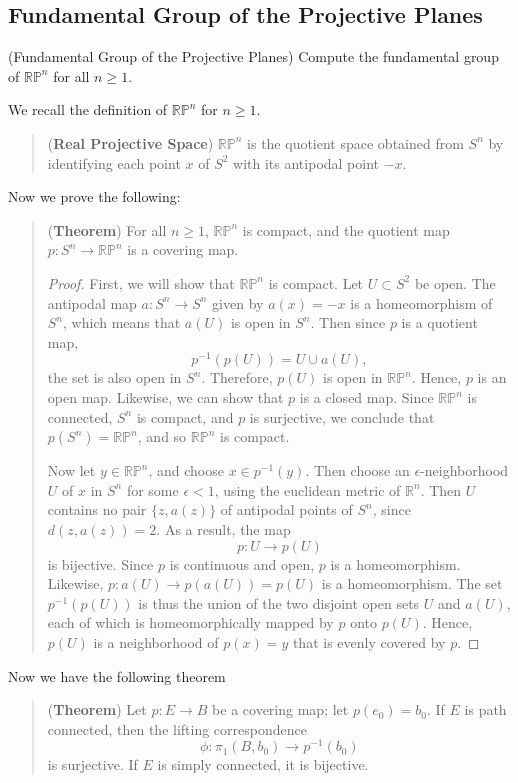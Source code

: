 \documentclass{article}
\begin{document}
\subsection{Fundamental Group of the Projective Planes}
\begin{prb}{(Fundamental Group of the Projective Planes)}
	Compute the fundamental group of $\mathbb{RP}^{n}$ for all $n \geq 1$. 
\end{prb}
\begin{solutions}
	We recall the definition of $\mathbb{RP}^{n}$ for $n \geq 1$. 
		\begin{quote}
			(\textbf{Real Projective Space}) $\mathbb{RP}^{n}$ is the quotient space obtained from $S^{n}$ by identifying each point $x$ of $S^{2}$ with its antipodal point $-x$. 
		\end{quote} 
	Now we prove the following: 
		\begin{quote}
			(\textbf{Theorem}) For all $n\geq 1$, $\mathbb{RP}^{n}$ is compact, and the quotient map $p: S^{n} \to \mathbb{RP}^{n}$ is a covering map. 
			
			\begin{proof}
				First, we will show that $\mathbb{RP}^{n}$ is compact. Let $U \subset S^{2}$ be open. The antipodal map $a: S^{n} \to S^{n}$ given by $a(x) = -x$ is a homeomorphism of $S^{n}$, which means that $a(U)$ is open in $S^{n}$. Then since $p$ is a quotient map,
					\begin{equation}
						p^{-1}(p(U)) = U \cup a(U), 
					\end{equation}
				the set is also open in $S^{n}$. Therefore, $p(U)$ is open in $\mathbb{RP}^{n}$. Hence, $p$ is an open map. Likewise, we can show that $p$ is a closed map. Since $\mathbb{RP}^{n}$ is connected, $S^{n}$ is compact, and $p$ is surjective, we conclude that $p(S^{n}) = \mathbb{RP}^{n}$, and so $\mathbb{RP}^{n}$ is compact. 
				
				Now let $y \in \mathbb{RP}^{n}$, and choose $x \in p^{-1}(y)$. Then choose an $\epsilon$-neighborhood $U$ of $x$ in $S^{n}$ for some $\epsilon < 1$, using the euclidean metric of $\mathbb{R}^{n}$. Then $U$ contains no pair $\{z, a(z)\}$ of antipodal points of $S^{n}$, since $d(z, a(z)) = 2$. As a result, the map $$p: U\to p(U)$$ is bijective. Since $p$ is continuous and open, $p$ is a homeomorphism. Likewise, $p: a(U) \to p(a(U)) = p(U)$ is a homeomorphism. The set $p^{-1}(p(U))$ is thus the union of the two disjoint open sets $U$ and $a(U)$, each of which is homeomorphically mapped by $p$ onto $p(U)$. Hence, $p(U)$ is a neighborhood of $p(x) =y$ that is evenly covered by $p$. 
			\end{proof} 
		\end{quote}
		Now we have the following theorem 
		\begin{quote}
			(\textbf{Theorem}) Let $p: E \to B$ be a covering map; let $p(e_{0}) = b_{0}$. If $E$ is path connected, then the lifting correspondence $$\phi: \pi_{1}(B, b_{0})\to p^{-1}(b_{0})$$ is surjective. If $E$ is simply connected, it is bijective. 
			

\end{quote}
\end{solutions}
\end{document}
